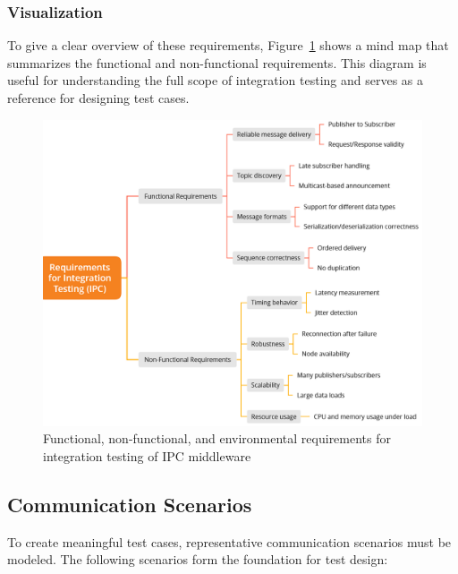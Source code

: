 \subsubsection{Visualization}

To give a clear overview of these requirements, Figure~\ref{fig:mm_requirements} shows a mind map that summarizes the functional and non-functional requirements. This diagram is useful for understanding the full scope of integration testing and serves as a reference for designing test cases.

\begin{figure}[H]
	\centering
	\includegraphics[width=\textwidth]{Images/mm_02_01_requirements.png}
	\caption{Functional, non-functional, and environmental requirements for integration testing of IPC middleware}
	\label{fig:mm_requirements}
\end{figure}

\subsection{Communication Scenarios}

To create meaningful test cases, representative communication scenarios must be modeled. The following scenarios form the foundation for test design:

